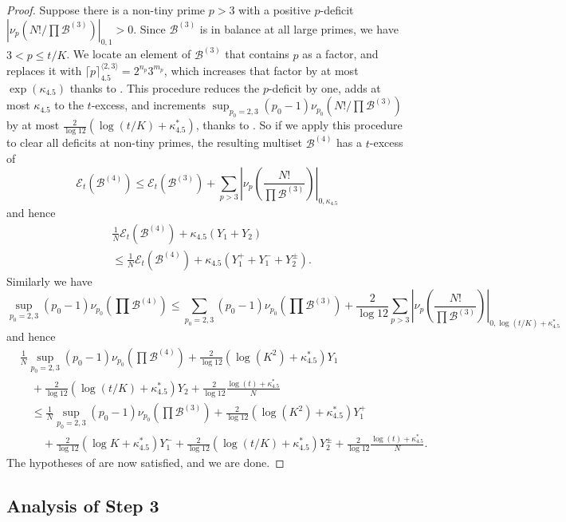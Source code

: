\documentclass[12pt,a4paper,reqno]{amsart}
\numberwithin{equation}{section}
\theoremstyle{plain}
\theoremstyle{definition}
\newcommand\tuple{{\mathcal B}}
\newcommand\excess{{\mathcal{E}}}
\begin{document}
\begin{proof} Suppose there is a non-tiny prime $p>3$ with a positive $p$-deficit
$|\nu_p(N!/\prod \tuple^{(3)})|_{0,1} > 0$.  Since $\tuple^{(3)}$ is in balance at all large primes, we have $3 < p \leq t/K$.  We locate an element of $\tuple^{(3)}$ that contains $p$ as a factor, and replaces it with $\lceil p \rceil^{\langle 2,3 \rangle}_{4.5} = 2^{n_p} 3^{m_p}$, which increases that factor by at most $\exp(\kappa_{4.5})$ thanks to .  This procedure reduces the $p$-deficit by one, adds at most $\kappa_{4.5}$ to the $t$-excess, and increments $\sup_{p_0=2,3} (p_0-1)\nu_{p_0}(N!/\prod \tuple^{(3)})$ by  at most $\frac{2}{\log 12}(\log(t/K) + \kappa^*_{4.5})$, thanks to .
So if we apply this procedure to clear all deficits at non-tiny primes, the resulting multiset $\tuple^{(4)}$ has a $t$-excess of
$$ \excess_t(\tuple^{(4)}) \leq \excess_t(\tuple^{(3)})  + \sum_{p > 3} \left|\nu_p\left(\frac{N!}{\prod \tuple^{(3)}}\right)\right|_{0,\kappa_{4.5}}$$
and hence
\begin{align*}
  &\frac{1}{N} \excess_t(\tuple^{(4)}) + \kappa_{4.5} (Y_1 + Y_2) \\
&\leq \frac{1}{N} \excess_t(\tuple^{(4)}) +
\kappa_{4.5} (Y^+_1 + Y^-_1 + Y_2^\pm).
\end{align*}
Similarly we have
$$\sup_{p_0=2,3} (p_0-1) \nu_{p_0}\left(\prod \tuple^{(4)}\right)  \leq
\sum_{p_0=2,3} (p_0-1) \nu_{p_0}\left(\prod \tuple^{(3)}\right) + \frac{2}{\log 12} \sum_{p>3} \left|\nu_p\left(\frac{N!}{\prod \tuple^{(3)}}\right)\right|_{0, \log(t/K)+\kappa^*_{4.5}}$$
and hence
\begin{align*}
  &\frac{1}{N} \sup_{p_0=2,3} (p_0-1) \nu_{p_0}\left(\prod \tuple^{(4)}\right) + \frac{2}{\log 12} (\log(K^2)+\kappa^*_{4.5}) Y_1 \\
  &\quad + \frac{2}{\log 12} (\log(t/K)+\kappa^*_{4.5}) Y_2 + \frac{2}{\log 12} \frac{\log(t) +\kappa^*_{4.5}}{N} \\
  &\quad \leq 
  \frac{1}{N} \sup_{p_0=2,3} (p_0-1) \nu_{p_0}\left(\prod \tuple^{(3)}\right)+ \frac{2}{\log 12}  (\log(K^2)+\kappa^*_{4.5}) Y^+_1 \\
  &\quad \quad + \frac{2}{\log 12} (\log K + \kappa^*_{4.5}) Y^-_1 + \frac{2}{\log 12} (\log(t/K)+\kappa^*_{4.5}) Y^\pm_2 + \frac{2}{\log 12} \frac{\log(t) +\kappa^*_{4.5}}{N}.
\end{align*}
The hypotheses of  are now satisfied, and we are done.
\end{proof}

\subsection{Analysis of Step 3}
\end{document}
